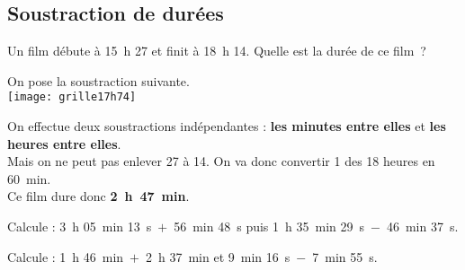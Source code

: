 \subsection{Soustraction de durées}

\begin{exemple*1}
Un film débute à 15 h 27 et finit à 18 h 14. Quelle est la durée de ce film ? \\[1em]



\begin{minipage}[t]{.34\textwidth}
On pose la soustraction suivante.\\[0.2em]

\texttt{[image: grille17h74]}
\end{minipage}\hfill%
\begin{minipage}[t]{.60\textwidth}
On effectue deux soustractions indépendantes : 
\textcolor{vert}{\textbf{les minutes entre elles}} et \textcolor{bleu}{\textbf{les heures entre elles}}.\\[0.75em]
Mais on ne peut pas enlever 27 à 14. 
On va donc convertir 1 des 18 heures en 60 min. \\[0.75em]
Ce film dure donc \textcolor{rose}{\textbf{2 h 47 min}}.
\end{minipage}

\end{exemple*1}


Calcule : 3 h 05 min 13 s $+$ 56 min 48 s puis 1 h 35 min 29 s $-$ 46 min 37 s.

Calcule : 1 h 46 min $+$ 2 h 37 min et 9 min 16 s $-$ 7 min 55 s.